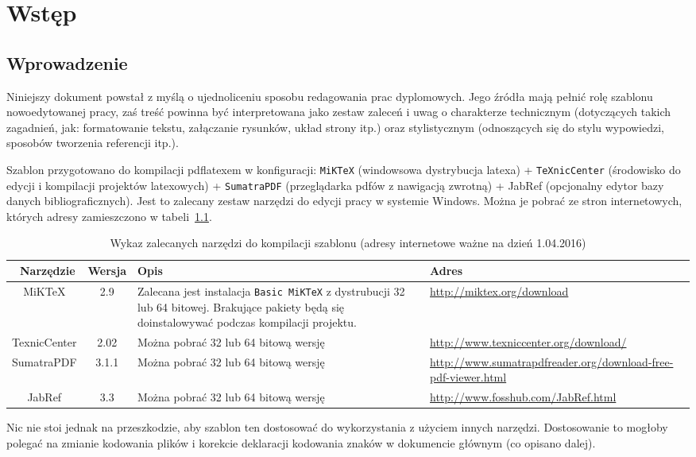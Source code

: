 \chapter{Wstęp}
\section{Wprowadzenie}
Niniejszy \cite{Kedzierski2016} dokument\cite{GettingStartedWithProcessing} powstał \cite{Borenstein1995} z myślą o ujednoliceniu sposobu redagowania prac dyplomowych. Jego źródła mają pełnić rolę szablonu nowoedytowanej pracy, zaś treść powinna być interpretowana jako zestaw zaleceń i uwag o charakterze technicznym (dotyczących takich zagadnień, jak: formatowanie tekstu, załączanie rysunków, układ strony itp.) oraz stylistycznym (odnoszących się do stylu wypowiedzi, sposobów tworzenia referencji itp.).

Szablon przygotowano do kompilacji pdflatexem w konfiguracji: \texttt{MiKTeX} (windowsowa dystrybucja latexa) + \texttt{TeXnicCenter} (środowisko do edycji i kompilacji projektów latexowych) + \texttt{SumatraPDF} (przeglądarka pdfów z nawigacją zwrotną) + JabRef (opcjonalny edytor bazy danych bibliograficznych). Jest to zalecany zestaw narzędzi do edycji pracy w systemie Windows. Można je pobrać ze stron internetowych, których adresy zamieszczono w tabeli~\ref{tab:narzedzia}.
\begin{table}[htb] \small
\centering
\caption{Wykaz zalecanych narzędzi do kompilacji szablonu (adresy internetowe ważne na dzień 1.04.2016)}
\label{tab:narzedzia}
\begin{tabularx}{\linewidth}{|c|c|X|p{6cm}|} \hline\
Narzędzie & Wersja & Opis & Adres \\ \hline\hline
MiKTeX & 2.9 & Zalecana jest instalacja \texttt{Basic MiKTeX} z dystrubucji 32 lub 64 bitowej. Brakujące pakiety będą się doinstalowywać podczas kompilacji projektu. &
\url{http://miktex.org/download} \\ \hline
TexnicCenter & 2.02 &  Można pobrać 32 lub 64 bitową wersję & \url{http://www.texniccenter.org/download/} \\ \hline
SumatraPDF & 3.1.1 & Można pobrać 32 lub 64 bitową wersję & \url{http://www.sumatrapdfreader.org/download-free-pdf-viewer.html} \\ \hline
JabRef & 3.3 & Można pobrać 32 lub 64 bitową wersję & \url{http://www.fosshub.com/JabRef.html} \\ \hline
\end{tabularx}
\end{table}
Nic nie stoi jednak na przeszkodzie, aby szablon ten dostosować do wykorzystania z użyciem innych narzędzi. Dostosowanie to mogłoby polegać na zmianie kodowania plików i korekcie deklaracji kodowania znaków w dokumencie głównym (co opisano dalej).


